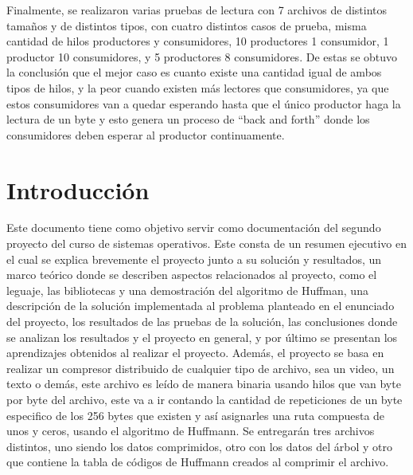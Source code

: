 \documentclass[12pt, article, natbib]{IEEEtran}
\begin{document}
Finalmente, se realizaron varias pruebas de lectura con 7 archivos de distintos tamaños y de distintos tipos, con cuatro distintos casos de prueba, misma cantidad de hilos productores y consumidores, 10 productores 1 consumidor, 1 productor 10 consumidores, y 5 productores 8 consumidores. De estas se obtuvo la conclusión que el mejor caso es cuanto existe una cantidad igual de ambos tipos de hilos, y la peor cuando existen más lectores que consumidores, ya que estos consumidores van a quedar esperando hasta que el único productor haga la lectura de un byte y esto genera un proceso de “back and forth” donde los consumidores deben esperar al productor continuamente.\\

\newpage
\twocolumn
\section{Introducción}
Este documento tiene como objetivo servir como documentación del segundo proyecto del curso de sistemas operativos. Este consta de un resumen ejecutivo en el cual se explica brevemente el proyecto junto a su solución y resultados, un marco teórico donde se describen aspectos relacionados al proyecto, como el leguaje, las bibliotecas y una demostración del algoritmo de Huffman, una descripción de la solución implementada al problema planteado en el enunciado del proyecto, los resultados de las pruebas de la solución, las conclusiones donde se analizan los resultados y el proyecto en general, y por último se presentan los aprendizajes obtenidos al realizar el proyecto. Además, el proyecto se basa en realizar un compresor distribuido de cualquier tipo de archivo, sea un video, un texto o demás, este archivo es leído de manera binaria usando hilos que van byte por byte del archivo, este va a ir contando la cantidad de repeticiones de un byte especifico de los 256 bytes que existen y así asignarles una ruta compuesta de unos y ceros, usando el algoritmo de Huffmann. Se entregarán tres archivos distintos, uno siendo los datos comprimidos, otro con los datos del árbol y otro que contiene la tabla de códigos de Huffmann creados al comprimir el archivo.
\end{document}
